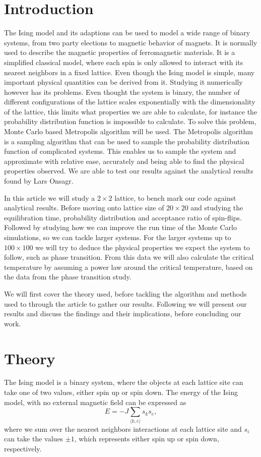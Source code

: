 \documentclass[%
reprint,
nofootinbib,
amsmath,amssymb,
aps,
]{revtex4-1}
\begin{document}
\section{Introduction} %
The Ising model and its adaptions can be used to model a wide range of binary systems, from two party elections to magnetic behavior of magnets. It is normally used to describe the magnetic properties of ferromagnetic materials. It is a simplified classical model, where each spin is only allowed to interact with its nearest neighbors in a fixed lattice. Even though the Ising model is simple, many important physical quantities can be derived from it. Studying it numerically however has its problems. Even thought the system is binary, the number of different configurations of the lattice scales exponentially with the dimensionality of the lattice, this limits what properties we are able to calculate, for instance the probability distribution function is impossible to calculate. To solve this problem, Monte Carlo based Metropolis algorithm will be used. The Metropolis algorithm is a sampling algorithm that can be used to sample the probability distribution function of complicated systems. This enables us to sample the system and approximate with relative ease, accurately and being able to find the physical properties observed. We are able to test our results against the analytical results found by Lars Onsagr\cite{LarsOnsager}. 

In this article we will study a $2\times 2$ lattice, to bench mark our code against analytical results. Before moving onto  lattice size of $20\times 20$ and studying the equilibration time, probability distribution and acceptance ratio of spin-flips. Followed by studying how we can improve the run time of the Monte Carlo simulations, so we can tackle larger systems. For the larger systems up to $100 \times 100$ we will try to deduce the physical properties we expect the system to follow, such as phase transition. From this data we will also calculate the critical temperature by assuming a power law around the critical temperature, based on the data from the phase transition study. 

We will first cover the theory used, before tackling the algorithm and methods used to through the article to gather our results. Following we will present our results and discuss the findings and their implications, before concluding our work. 
\section{Theory} %
The Ising model is a binary system, where the objects at each lattice site can take one of two values, either spin up or spin down. 
The energy of the Ising model, with no external magnetic field can be expressed as 
\begin{equation}
	E = -J\sum_{\langle k,e \rangle} s_ks_e,
\end{equation}
where we sum over the nearest neighbors interactions at each lattice site and $s_i$ can take the values $\pm 1$, which represents either spin up or spin down, respectively. 
\end{document}

